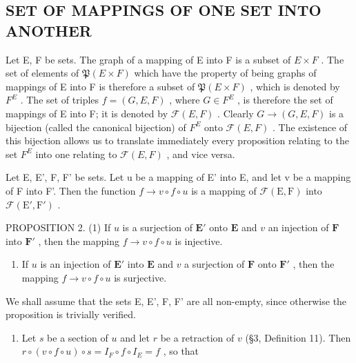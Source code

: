 \subsection{SET OF MAPPINGS OF ONE SET INTO ANOTHER}

Let E, F be sets. The graph of a mapping of E into F is a subset of \(E \times F\) . The set of elements of \(\mathfrak{P}(E \times F)\) which have the property of being graphs of mappings of E into F is therefore a subset of \(\mathfrak{P}(E \times F)\) , which is denoted by \(F^{E}\) . The set of triples \(f = (G, E, F)\) , where \(G \in F^{E}\) , is therefore the set of mappings of E into F; it is denoted by \(\mathcal{F}(E, F)\) . Clearly \(G \to (G, E, F)\) is a bijection (called the canonical bijection) of \(F^{E}\) onto \(\mathcal{F}(E, F)\) . The existence of this bijection allows us to translate immediately every proposition relating to the set \(F^{E}\) into one relating to \(\mathcal{F}(E, F)\) , and vice versa.

Let E, E', F, F' be sets. Let u be a mapping of E' into E, and let v be a mapping of F into F'. Then the function \(f \rightarrow v \circ f \circ u\) is a mapping of \(\mathcal{F}(\mathrm{E}, \mathrm{F})\) into \(\mathcal{F}(\mathrm{E}', \mathrm{F}')\) .

PROPOSITION 2. (1) If \(u\) is a surjection of \(\mathbf{E}'\) onto \(\mathbf{E}\) and \(v\) an injection of \(\mathbf{F}\) into \(\mathbf{F}'\) , then the mapping \(f \to v \circ f \circ u\) is injective.

\begin{enumerate}
\def\labelenumi{(\arabic{enumi})}
\setcounter{enumi}{1}
\tightlist
\item
  If \(u\) is an injection of \(\mathbf{E}'\) into \(\mathbf{E}\) and \(v\) a surjection of \(\mathbf{F}\) onto \(\mathbf{F}'\) , then the mapping \(f \to v \circ f \circ u\) is surjective.
\end{enumerate}

We shall assume that the sets E, E', F, F' are all non-empty, since otherwise the proposition is trivially verified.

\begin{enumerate}
\def\labelenumi{(\arabic{enumi})}
\tightlist
\item
  Let \(s\) be a section of \(u\) and let \(r\) be a retraction of \(v\) (§3, Definition 11). Then \(r \circ (v \circ f \circ u) \circ s = I_F \circ f \circ I_E = f\) , so that
\end{enumerate}

